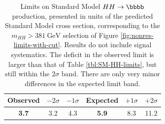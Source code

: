 \begin{table}
\centering
\begin{tabular}{ |c|c|c|c|c|c| } 
\hline
\textbf{Observed} & $-2\sigma$ & $-1\sigma$ & \textbf{Expected} & $+1\sigma$ & $+2\sigma$\\
 \hline
\textbf{3.7}	& 3.2	& 4.3 & \textbf{5.9}	& 8.3 & 11.2\\
 \hline
\end{tabular}
 \caption{\label{tbl:SM-HH-limits-mhh-cut} Limits on Standard Model $HH\rightarrow \bbbb$ production, 
 presented in units of the predicted Standard Model cross section, corresponding to the $m_{HH} > \SI{381}{\GeV}$ 
 selection of Figure \ref{fig:nonres-limits-with-cut}. Results do not include signal systematics. The deficit 
 in the observed limit is larger than that of Table \ref{tbl:SM-HH-limits}, but still within the $2\sigma$ band. There 
 are only very minor differences in the expected limit band.}
\end{table}
